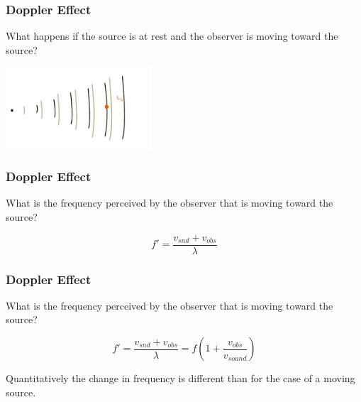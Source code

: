 \documentclass[]{beamer}
\begin{document}

\begin{frame}
\frametitle{Doppler Effect}


What happens if the source is at rest and the observer is moving toward the source?



  \begin{center}
  \includegraphics[height=1.2in]{images4/doppler6.jpg}
\end{center}


  \end{frame}








\begin{frame}
\frametitle{Doppler Effect}


What is the frequency perceived by the observer that is moving toward the source?

\begin{equation}
f'=\frac{v_{snd}+v_{obs}}{\lambda}
\end{equation}



  \end{frame}











\begin{frame}
\frametitle{Doppler Effect}


What is the frequency perceived by the observer that is moving toward the source?

\begin{equation}
f'=\frac{v_{snd}+v_{obs}}{\lambda}=f\left(1+\frac{v_{obs}}{v_{sound}}\right)
\end{equation}



\pause


Quantitatively the change in frequency is different
than for the case of a moving source. 



  \end{frame}
\end{document}
